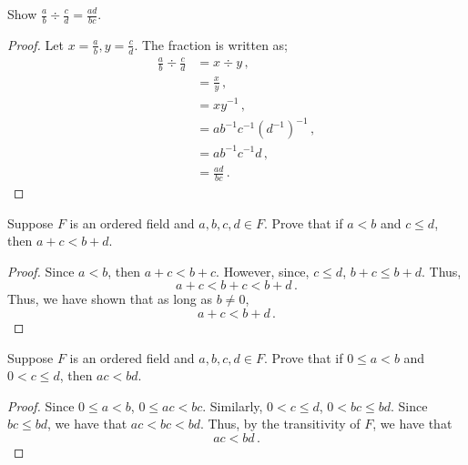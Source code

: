 \fullpageboxline
\begin{problem}
    Show $\frac{a}{b} \div \frac{c}{d} = \frac{ad}{bc}$.
\end{problem}
\begin{proof}
    Let $x = \frac{a}{b}, y = \frac{c}{d}$. The fraction is written as;
    \begin{align*}
        \frac{a}{b}\div \frac{c}{d} &= x \div y\,, \\
         &= \frac{x}{y}\,, \\
        &= x y^{-1}\,,\\ &
        = a b^{-1} c^{-1}(d^{-1})^{-1}\,, \\
        &= a b^{-1} c^{-1} d\,, \\
        &= \frac{ad}{bc}\,.
    \end{align*}
\end{proof}

\fullpageboxline
\begin{problem}
Suppose $F$ is an ordered field and $a, b, c, d \in F$. Prove that if $a < b$ and $c \le d$, then $a + c < b + d$.
\end{problem}
\begin{proof}
    Since $a < b$, then $a + c < b + c$. However, since, $c \leq d$, $b + c \leq b + d$. Thus, 
    \begin{equation*}
        a + c < b +c < b  + d\,.
    \end{equation*}
    Thus, we have shown that as long as $ b \neq 0$,
    \begin{equation*}
        a + c < b + d\,.
    \end{equation*}
\end{proof}

\fullpageboxline
\begin{problem}
Suppose $F$ is an ordered field and $a, b, c, d \in F$. Prove that if $0 \le a < b$ and $0 < c \le d$, then $ac < bd$.
\end{problem}
\begin{proof}
    Since $0 \leq a < b$, $0 \leq ac < bc$. Similarly, $0 < c \leq d$, $0 < bc \leq bd$. Since $bc \leq bd$, we have that $ac < bc < bd$. Thus, by the transitivity of $F$, we have that 
    \begin{equation*}
        ac < bd\,.
    \end{equation*}
\end{proof}


